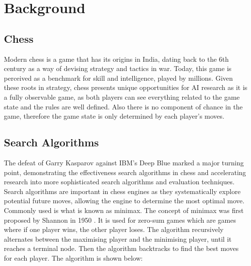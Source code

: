 \chapter{Background}
\section{Chess}
Modern chess is a game that has its origins in India, dating back to the 6th century 
as a way of devising strategy and tactics in war. Today, this game is perceived as a benchmark for skill and intelligence, played by millions. Given these roots in strategy, chess presents unique opportunities for AI research as it is a fully observable game, as both players can see everything related to the game state and the rules are well defined. Also there is no component of chance in the game, therefore the game state is only determined by each player's moves.


\section{Search Algorithms}

The defeat of Garry Kasparov against IBM's Deep Blue marked a major turning point, demonstrating the effectiveness search algorithms in chess and accelerating research into more sophisticated search algorithms and evaluation techniques. Search algorithms are important in chess engines as they systematically explore potential future moves, allowing the engine to determine the most optimal move. Commonly used is what is known as minimax. The concept of minimax was first proposed by Shannon in 1950 \cite{shannonXXIIProgrammingComputer1950}.
It is used for zero-sum games which are games where if one player wins, the other player loses. The algorithm recursively alternates between the maximising player and the minimising player, until it reaches a terminal node. Then the algorithm backtracks to find the best moves for each player. The algorithm is shown below:


